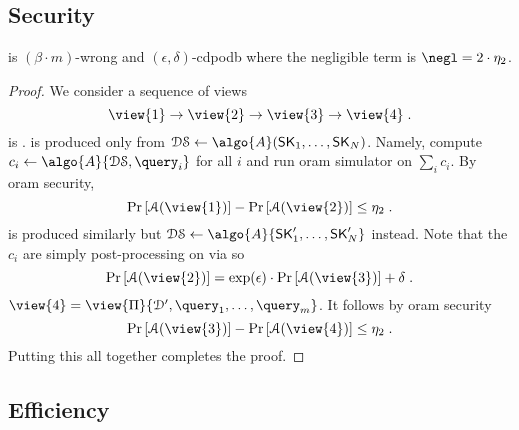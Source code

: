 		

	\subsection{Security}

		\begin{theorem}
			\epsolute{} is $(\beta \cdot m)$-wrong and $(\epsilon, \delta)$-\acrshort{cdpodb} where the negligible term is $\negl = 2 \cdot \eta_2$.
		\end{theorem}

		\begin{proof}
			We consider a sequence of views
			\[
				\view{1} \to \view{2} \to \view{3} \to \view{4} \; .
			\]
			 is .
			 is produced only from $\serverDS \gets \algo{A}(\fromNtoM{\searchKey}{1}{\domainSize})$. %
			Namely, compute $c_i \gets \algo{A}{\serverDS, \query_i}$ for all $i$ and run \acrshort{oram} simulator on $\sum_i c_i$.
			By \acrshort{oram} security,
			\[
				\probability{\adversary(\view{1})} - \probability{\adversary(\view{2})} \leq \eta_2 \; .
			\]
			 is produced similarly but $\serverDS \gets \algo{A}{\fromNtoM{\searchKey^\prime}{1}{\domainSize}}$ instead.
			Note that the $c_i$ are simply post-processing on \serverDS{} via  so
			\[
				\probability{\adversary(\view{2})} = \exp(\epsilon) \cdot \probability{\adversary(\view{3})} + \delta \; .
			\]
			$\view{4} = \view{\protocol}{\database^\prime, \fromNtoM{\query}{1}{m}}$.
			It follows by \acrshort{oram} security
			\[
				\probability{\adversary(\view{3})} - \probability{\adversary(\view{4})} \leq \eta_2 \; .
			\]
			Putting this all together completes the proof.
		\end{proof}

	\subsection{Efficiency}

